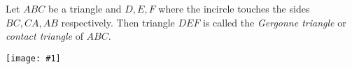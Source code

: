 \documentclass[12pt]{article}
\newcommand{\figura}[1]{\begin{center}\texttt{[image: \#1]}\end{center}}
\begin{document}
Let $ABC$ be a triangle and $D,E,F$ where the incircle touches the sides $BC,CA,AB$ respectively. Then triangle $DEF$ is called the \emph{Gergonne triangle} or \emph{contact triangle} of $ABC$.
\figura{gergonne}
\end{document}
